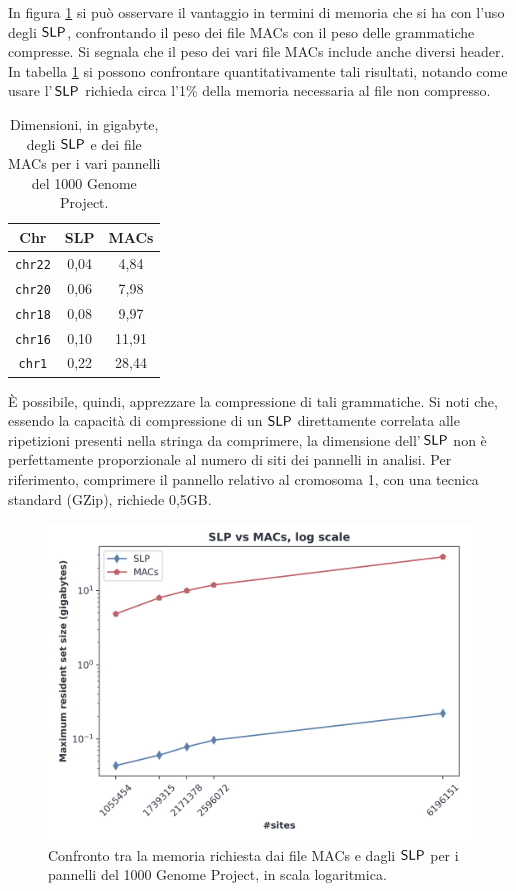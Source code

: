 In figura \ref{fig:slpmacschr} si può osservare il vantaggio in termini di
memoria che si ha con l'uso degli $\mbox{\rm {\sf SLP}}$, confrontando il peso dei file
MACs con il peso delle grammatiche compresse. Si segnala che il
peso dei vari file MACs include anche diversi header. In tabella
\ref{tab:slpmacs} si possono
confrontare quantitativamente tali risultati, notando come usare l'$\,\mbox{\rm {\sf SLP}}$
richieda circa l'1\% della memoria necessaria al file non compresso.
\begin{table}
  \centering
  \caption{Dimensioni, in gigabyte, degli $\mbox{\rm {\sf SLP}}$ e dei file MACs
  per i vari pannelli del 1000 Genome Project.}
  \begin{tabular}{c||c|c}
    \textbf{Chr} & \textbf{SLP}
    & \textbf{MACs} \\
    \hline
    \hline
    \texttt{chr22} & 0,04 & 4,84\\
    \texttt{chr20} & 0,06 & 7,98\\
    \texttt{chr18} & 0,08 & 9,97\\
    \texttt{chr16} & 0,10 & 11,91\\
    \texttt{chr1} & 0,22 & 28,44\\
  \end{tabular}
  \label{tab:slpmacs}
\end{table}
È possibile, quindi, apprezzare la compressione di tali
grammatiche.  
Si noti che, essendo la capacità di compressione di un $\mbox{\rm {\sf SLP}}$
direttamente correlata alle ripetizioni presenti nella stringa da comprimere, la
dimensione dell'$\,\mbox{\rm {\sf SLP}}$ non è perfettamente proporzionale al numero di siti
dei pannelli in analisi. Per riferimento, comprimere il pannello relativo al
cromosoma 1, con una tecnica standard (GZip), richiede 0,5GB.
\begin{figure}
  \centering
  \includegraphics[width=0.7\linewidth]{img/slp_vs_macs_log.png}
  \caption{Confronto tra la memoria richiesta dai file MACs e dagli $\mbox{\rm {\sf SLP}}$ per i
    pannelli del 1000 Genome Project, in scala
    logaritmica.} 
  \label{fig:slpmacschr}
\end{figure}
